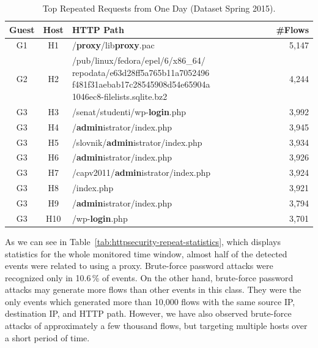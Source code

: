 \begin{table}[ht]
\centering
\begin{tabular}{| c | c | l | r|} \hline
Guest & Host & HTTP Path & \#Flows \\ \hline
G1  & H1 & /\textbf{proxy}/lib\textbf{proxy}.pac & 5,147 \\ \hline
G2  & H2 & \parbox[t]{6cm}{/pub/linux/fedora/epel/6/x86\_64/ repodata/e63d28ff5a765b11a7052496\\f481f31aebab17c28545908d54e65904a\\1046ec8-filelists.sqlite.bz2} & 4,244 \\ \hline
G3  & H3 & /senat/studenti/wp-\textbf{login}.php & 3,992 \\ \hline
G3  & H4 & /\textbf{admin}istrator/index.php & 3,945 \\ \hline
G3  & H5 & /slovnik/\textbf{admin}istrator/index.php & 3,934 \\ \hline
G3  & H6 & /\textbf{admin}istrator/index.php & 3,926 \\ \hline
G3  & H7 & /capv2011/\textbf{admin}istrator/index.php & 3,924 \\ \hline
G3  & H8 & /index.php & 3,921 \\ \hline
G3  & H9 & /\textbf{admin}istrator/index.php & 3,794 \\ \hline
G3  & H10 & /wp-\textbf{login}.php & 3,701 \\ \hline
\end{tabular}
\caption{Top Repeated Requests from One Day (Dataset Spring 2015).}
\label{tab:httpsecurity-repeat2}
\end{table}

As we can see in Table~\ref{tab:httpsecurity-repeat-statistics}, which displays statistics for the whole monitored time window, almost half of the detected events were related to using a proxy. Brute-force password attacks were recognized only in 10.6\,\% of events. On the other hand, brute-force password attacks may generate more flows than other events in this class. They were the only events which generated more than 10,000 flows with the same source IP, destination IP, and HTTP path. However, we have also observed brute-force attacks of approximately a few thousand flows, but targeting multiple hosts over a short period of time.

